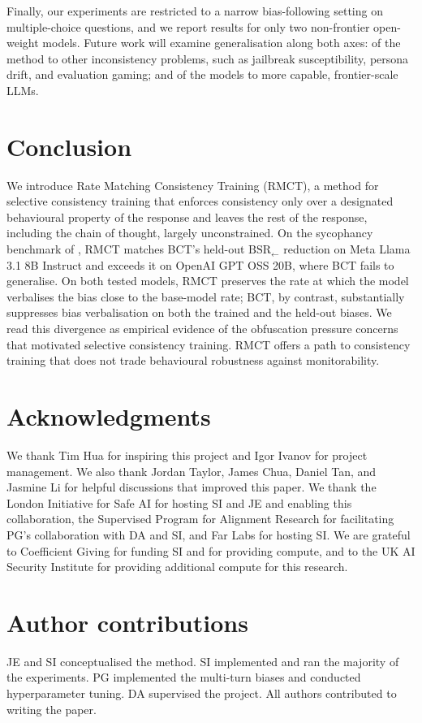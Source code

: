 \documentclass{article}
\begin{document}
Finally, our experiments are restricted to a narrow bias-following setting on
multiple-choice questions, and we report results for only two
non-frontier open-weight models. Future work will examine
generalisation along both axes: of the method to other inconsistency
problems, such as jailbreak susceptibility, persona drift, and
evaluation gaming; and of the models to more capable,
frontier-scale LLMs. 

\section{Conclusion}
We introduce Rate Matching Consistency Training (RMCT), a
method for selective consistency training that enforces consistency
only over a designated behavioural property of the response and
leaves the rest of the response, including the chain of thought,
largely unconstrained. On the sycophancy benchmark of
\citet{chua_bias-augmented_2024}, RMCT matches BCT's held-out
$\text{BSR}_{\leftarrow}$ reduction on Meta Llama 3.1 8B Instruct
and exceeds it on OpenAI GPT OSS 20B, where BCT fails to generalise.
On both tested models, RMCT preserves the rate at which the model verbalises the bias close to the base-model rate;
BCT, by contrast, substantially suppresses bias verbalisation on both
the trained and the held-out biases. We read this divergence as empirical evidence of the obfuscation pressure concerns that motivated
selective consistency training. RMCT offers a path to consistency training that does not trade
behavioural robustness against monitorability.

\fi
\section*{Acknowledgments}
We thank Tim Hua for inspiring this project and Igor Ivanov for
project management. We also thank Jordan Taylor, James Chua, Daniel Tan, and Jasmine Li for helpful discussions that improved this paper. We
thank the London Initiative for Safe AI for hosting SI and JE and
enabling this collaboration, the Supervised Program for Alignment
Research for facilitating PG's collaboration with DA and SI, and Far Labs for hosting SI. We are
grateful to Coefficient Giving for funding SI and for providing
compute, and to the UK AI Security Institute for providing additional
compute for this research.

\section*{Author contributions}
JE and SI conceptualised the method. SI implemented and ran the
majority of the experiments. PG implemented the multi-turn biases and
conducted hyperparameter tuning. DA supervised the project. All
authors contributed to writing the paper.
\end{document}
